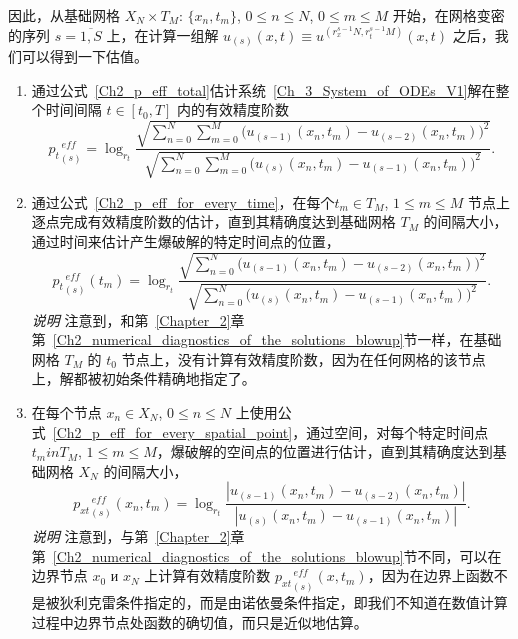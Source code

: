 \documentclass[twoside]{book}
\begin{document}
\begin{CJK*}{GBK}{song}
因此，从基础网格 $X_N \times T_M$: $\{x_n,t_m\}$, $0 \leqslant n \leqslant N$, $0 \leqslant m \leqslant M$ 开始，在网格变密的序列 $s = \overline{1,S}$ 上，在计算一组解 $u_{(s)}(x,t) \equiv u^{(r_x^{s - 1}N,r_t^{s - 1}M)}(x,t)$ 之后，我们可以得到一下估值。
\begin{enumerate}
    \item 通过公式~\eqref{Ch2_p_eff_total}估计系统~\eqref{Ch_3_System_of_ODEs_V1}解在整个时间间隔 $t \in [t_0,T]$ 内的有效精度阶数
        \begin{equation*}
            \label{Ch3_p_eff_total}
        	{p_t}^{\, eff}_{(s)} = \log_{r_t}{\dfrac{\sqrt{\sum\limits_{n = 0}^N \sum\limits_{m = 0}^M \big(u_{(s - 1)}(x_n,t_m) - u_{(s - 2)}(x_n,t_m)\big)^2}}{\sqrt{\sum\limits_{n = 0}^N\sum\limits_{m = 0}^M  \big(u_{(s)}(x_n,t_m) - u_{(s - 1)}(x_n,t_m)\big)^2}}}.
        \end{equation*}
    \item 通过公式~\eqref{Ch2_p_eff_for_every_time}，在每个$t_m \in T_M$, $1 \leqslant m \leqslant M$ 节点上逐点完成有效精度阶数的估计，直到其精确度达到基础网格 $T_M$ 的间隔大小，通过时间来估计产生爆破解的特定时间点的位置，
        \begin{equation*}
            \label{Ch3_p_eff_for_every_time}
        	{p_t}^{\, eff}_{(s)}(t_m) = \log_{r_t}{\dfrac{\sqrt{\sum\limits_{n = 0}^N \big(u_{(s - 1)}(x_n,t_m) - u_{(s - 2)}(x_n,t_m)\big)^2}}{\sqrt{\sum\limits_{n = 0}^N  \big(u_{(s)}(x_n,t_m) - u_{(s - 1)}(x_n,t_m)\big)^2}}}.
        \end{equation*}
        \emph{说明 } 注意到，和第~\ref{Chapter_2}章第~\ref{Ch2_numerical_diagnostics_of_the_solutions_blowup}节一样，在基础网格 $T_M$ 的 $t_0$ 节点上，没有计算有效精度阶数，因为在任何网格的该节点上，解都被初始条件精确地指定了。
    \item 在每个节点 $x_n \in X_N$, $0 \leqslant n \leqslant N$ 上使用公式~\eqref{Ch2_p_eff_for_every_spatial_point}，通过空间，对每个特定时间点 $t_m in T_M$, $1 \leqslant m \leqslant M$，爆破解的空间点的位置进行估计，直到其精确度达到基础网格 $X_N$ 的间隔大小，
        \begin{equation*}
            \label{Ch3_p_eff_for_every_spatial_point}
        	{p_{xt}}^{\, eff}_{(s)}(x_n,t_m) = \log_{r_t}{\dfrac{|u_{(s - 1)}(x_n,t_m) - u_{(s - 2)}(x_n,t_m)|}{|u_{(s)}(x_n,t_m) - u_{(s - 1)}(x_n,t_m)|}}.
        \end{equation*}
        \emph{说明 } 注意到，与第~\ref{Chapter_2}章第~\ref{Ch2_numerical_diagnostics_of_the_solutions_blowup}节不同，可以在边界节点 $x_0$ и $x_N$ 上计算有效精度阶数 ${p_{xt}}_{(s)}^{\, eff}(x,t_m)$，因为在边界上函数不是被狄利克雷条件指定的，而是由诺依曼条件指定，即我们不知道在数值计算过程中边界节点处函数的确切值，而只是近似地估算。
\end{enumerate}


\end{CJK*}
\end{document}

